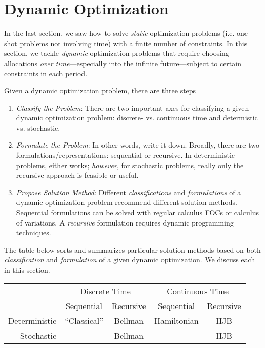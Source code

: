 \documentclass[12pt]{article}
\numberwithin{equation}{section} %
\theoremstyle{plain}
\theoremstyle{definition}
\theoremstyle{remark}
\begin{document}



\clearpage
\section{Dynamic Optimization}

In the last section, we saw how to solve \emph{static} optimization
problems (i.e. one-shot problems not involving time) with a finite
number of constraints.
In this section, we tackle \emph{dynamic} optimization problems that
require choosing allocations \emph{over time}---especially into the
infinite future---subject to certain constraints in each period.

Given a dynamic optimization problem, there are three steps
\begin{enumerate}[label=(\roman*)]
  \item \emph{Classify the Problem}:
    There are two important axes for classifying a given dynamic
    optimization problem: discrete- vs. continuous time and determistic
    vs. stochastic.
  \item \emph{Formulate the Problem}: In other words, write it down.
    Broadly, there are two formulations/representations: sequential or
    recursive.
    In deterministic problems, either works; \emph{however}, for
    stochastic problems, really only the recursive approach is feasible
    or useful.
  \item \emph{Propose Solution Method}:
    Different \emph{classifications} and \emph{formulations} of a
    dynamic optimization problem recommend different solution methods.
    Sequential formulations can be solved with regular calculus FOCs or
    calculus of variations. A \emph{recursive} formulation requires
    dynamic programming techniques.
\end{enumerate}
The table below sorts and summarizes particular solution methods based
on both \emph{classification} and \emph{formulation} of a given dynamic
optimization. We discuss each in this section.
\begin{table}[htbp!]
\centering
\begin{tabular}{|r|cc|cc|}
  \hline
  & \multicolumn{2}{c}{Discrete Time}
  & \multicolumn{2}{|c|}{Continuous Time} \\\cline{2-3}\cline{4-5}
  & Sequential & Recursive & Sequential & Recursive \\\hline\hline
  Deterministic & ``Classical'' & Bellman & Hamiltonian & HJB \\\hline
  Stochastic & &Bellman & &HJB \\\hline
\end{tabular}
\end{table}
\end{document}
